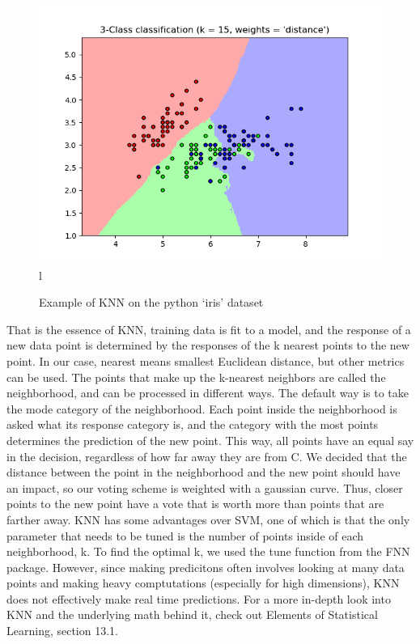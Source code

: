 \documentclass[11pt, oneside]{article}   	%
\begin{document}
\begin{figure}
\caption{Example of KNN on the python `iris' dataset}
\includegraphics[width=\textwidth]{Figure_2.png}l
\end{figure}
 
That is the essence of KNN, training data is fit to a model, and the response of a new data point is determined by the responses of the k nearest points to the new point. In our case, nearest means smallest Euclidean distance, but other metrics can be used. The points that make up the k-nearest neighbors are called the neighborhood, and can be processed in different ways. The default way is to take the mode category of the neighborhood. Each point inside the neighborhood is asked what its response category is, and the category with the most points determines the prediction of the new point. This way, all points have an equal say in the decision, regardless of how far away they are from C. We decided that the distance between the point in the neighborhood and the new point should have an impact, so our voting scheme is weighted with a gaussian curve. Thus, closer points to the new point have a vote that is worth more than points that are farther away. KNN has some advantages over SVM, one of which is that the only parameter that needs to be tuned is the number of points inside of each neighborhood, k. To find the optimal k, we used the tune function from the FNN package. \cite{FNN} However, since making predicitons often involves looking at many data points and making heavy comptutations (especially for high dimensions), KNN does not effectively make real time predictions. For a more in-depth look into KNN and the underlying math behind it, check out Elements of Statistical Learning, section 13.1. \cite{KNNBook}
\end{document}
